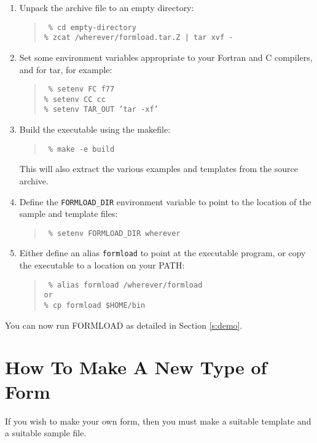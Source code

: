 \begin{enumerate}

\item  Unpack the archive file to an empty directory:
\begin{quote}\tt
\% cd empty-directory\\
\% zcat /wherever/formload.tar.Z | tar xvf -
\end{quote}

\item  Set some environment variables appropriate to your Fortran and C
compilers, and for tar, for example:

\begin{quote}\tt
\% setenv FC f77 \\
\% setenv CC cc \\
\% setenv TAR\_OUT 'tar -xf'
\end{quote}

\item  Build the executable using the makefile:
\begin{quote}\tt
\% make -e build
\end{quote}
This will also extract the various examples and templates from the source
archive.

\item  Define the {\tt FORMLOAD\_DIR} environment variable to point to the
location of the sample and template files:
\begin{quote}\tt
\% setenv FORMLOAD\_DIR wherever
\end{quote}

\item  Either define an alias \verb|formload| to point at the executable
program, or copy the executable to a location on your PATH:
\begin{quote}\tt
\% alias formload /wherever/formload \\
{\rm or} \\
\% cp formload \$HOME/bin
\end{quote}

\end{enumerate}

You can now run FORMLOAD as detailed in Section \ref{s:demo}.

\section{How To Make A New Type of Form}
\label{se:make}

If you wish to make your own form, then you must make a suitable template
and a suitable sample file. 

